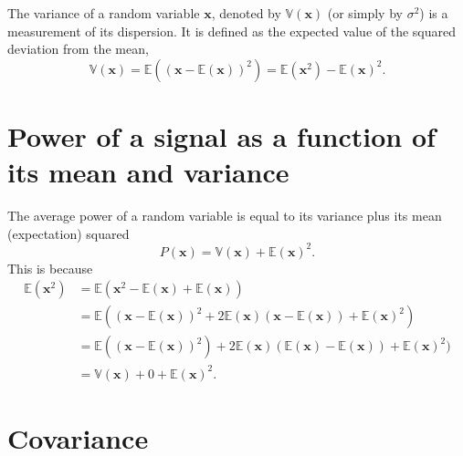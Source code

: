 The variance of a random variable $\mathbf{x}$, denoted by
$\mathbb{V}(\mathbf{x})$ (or simply by $\sigma^2$) is a measurement of
its dispersion. It is defined as the expected value of the squared
deviation from the mean,
\begin{equation}
  \mathbb{V}(\mathbf{x}) = \mathbb{E}\left((\mathbf{x} - \mathbb{E}(\mathbf{x}))^2 \right) = \mathbb{E}(\mathbf{x}^2)-\mathbb{E}(\mathbf{x})^2.
  \label{eq:variance}
\end{equation}


\section{Power of a signal as a function of its mean and variance}
The average power of a random variable is equal to its variance plus its mean
(expectation) squared
\begin{equation}
  P(\mathbf{x}) =  \mathbb{V}(\mathbf{x}) + \mathbb{E}(\mathbf{x})^2.
  \label{eq:power_mean_variance}
\end{equation}
This is because
\begin{align*}
  \mathbb{E}(\mathbf{x}^2)
  & = \mathbb{E}(\mathbf{x}^2 - \mathbb{E}(\mathbf{x}) + \mathbb{E}(\mathbf{x})) \\
  & = \mathbb{E}((\mathbf{x} - \mathbb{E}(\mathbf{x}))^2 + 2\mathbb{E}(\mathbf{x})(\mathbf{x}-\mathbb{E}(\mathbf{x})) + \mathbb{E}(\mathbf{x})^2) \\
  & = \mathbb{E}((\mathbf{x}-\mathbb{E}(\mathbf{x}))^2) + 2\mathbb{E}(\mathbf{x})(\mathbb{E}(\mathbf{x})-\mathbb{E}(\mathbf{x})) + \mathbb{E}(\mathbf{x})^2) \\
  & = \mathbb{V}(\mathbf{x}) + 0 + \mathbb{E}(\mathbf{x})^2.
\end{align*}

\section{Covariance}
\label{sec:covariance}

